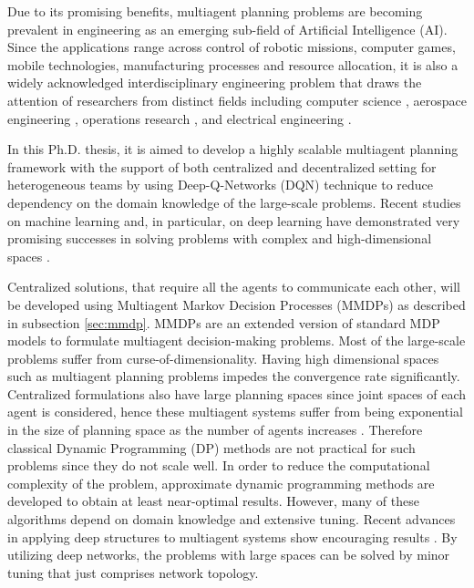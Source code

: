 \documentclass{ituphdreport}
\begin{document}
Due to its promising benefits, multiagent planning problems are becoming prevalent in engineering as an emerging sub-field of Artificial Intelligence (AI). Since the applications range across control of robotic missions, computer games, mobile technologies, manufacturing processes and resource allocation, it is also a widely acknowledged interdisciplinary engineering problem that draws the attention of researchers from distinct fields including computer science \cite{stone00}, aerospace engineering \cite{tomlin98}, operations research \cite{swaminathan98}, and electrical engineering \cite{glavic06}.

In this Ph.D. thesis, it is aimed to develop a highly scalable multiagent planning framework with the support of both centralized and decentralized setting for heterogeneous teams by using Deep-Q-Networks (DQN) technique to reduce dependency on the domain knowledge of the large-scale problems. Recent studies on machine learning and, in particular, on deep learning have demonstrated very promising successes in solving problems with complex and high-dimensional spaces \cite{silver2016mastering} \cite{zhang2016learning}\cite{mnih-dqn-2015}.

Centralized solutions, that require all the agents to communicate each other, will be developed using Multiagent Markov Decision Processes (MMDPs) as described in subsection \ref{sec:mmdp}. MMDPs are an extended version of standard MDP models to formulate multiagent decision-making problems. Most of the large-scale problems suffer from curse-of-dimensionality. Having high dimensional spaces such as multiagent planning problems impedes the convergence rate significantly. Centralized formulations also have large planning spaces since joint spaces of each agent is considered, hence these multiagent systems suffer from being exponential in the size of planning space as the number of agents increases \cite{redding2011approximate}. Therefore classical Dynamic Programming (DP) methods are not practical for such problems since they do not scale well. In order to reduce the computational complexity of the problem, approximate dynamic programming methods are developed to obtain at least near-optimal results. However, many of these algorithms depend on domain knowledge and extensive tuning. Recent advances in applying deep structures to multiagent systems show encouraging results \cite{hausknecht2015deep}\cite{tampuu2017multiagent}. By utilizing deep networks, the problems with large spaces can be solved by minor tuning that just comprises network topology. 
\end{document}
